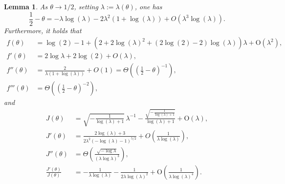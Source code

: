 \documentclass[a4paper,12pt]{article}
\newtheorem{lemma}[theorem]{Lemma}
\theoremstyle{definition}
\newcommand{\bigO}[1]{O\left({#1}\right)}
\newcommand{\bigTheta}[1]{\Theta\left({#1}\right)}
\newcommand{\halfminth}{\left(\frac 1 2 -\theta\right)}
\begin{document}
\begin{lemma}\label{lem_prop_large_theta}
    As $\theta\to 1/2$, setting $\lambda:=\lambda(\theta)$, one has
\begin{equation}\label{eq_large_theta_lambda}
   \frac{1}{2}-\theta =-\lambda\log(\lambda)-2\lambda^{2}(1+\log(\lambda))+O(\lambda^{3}\log(\lambda)).
\end{equation}
Furthermore, it holds that
\begin{align}
    f(\theta)&=\log\! \left(2\right)-1+\left(2+2 \log\! \left(\lambda \right)^{2}+\left(2 \log\! \left(2\right)-2\right) \log\! \left(\lambda \right)\right) \lambda +\mathrm{O}\! \left(\lambda^{2}\right),\label{eq_f_as_theta_large}\\
    f'(\theta)&=2\log \lambda+2\log(2)+\bigO{\lambda},\label{eq_fprim_as_theta_large}\\
    f''(\theta)&=\frac{2}{\lambda(1+\log(\lambda))}+\bigO{1}=\bigTheta{\halfminth^{-1}},\label{eq_fsec_as_theta_large}\\
    f'''(\theta)&=\Theta\left(\left(\frac 1 2 -\theta \right)^{-2}\right),\label{eq_fter_as_theta_large}
    \end{align}
and
\begin{align}
    J(\theta)&=\sqrt{-\frac{1}{\log\! \left(\lambda \right)+1}}\, \lambda^{-1}-\frac{\sqrt{-\frac{1}{\log\left(\lambda \right)+1}}}{\log\! \left(\lambda \right)+1}+\mathrm{O}\! \left(\lambda \right),\label{eq_J_as_theta_large}\\
   J'(\theta)&=\frac{2\log(\lambda)+3}{2\lambda^{2}(-\log(\lambda)-1)^{5/2}}+\bigO{\frac{1}{\lambda\log(\lambda)}},\label{eq_Jprim_as_theta_large}\\
   J''(\theta)&=\bigTheta{\frac{\sqrt{-\log \lambda}}{(\lambda\log\lambda)^3}},\label{eq_Jsec_as_theta_large}\\
   \frac{J'(\theta)}{J(\theta)}&=-\frac{1}{\lambda\log(\lambda)}-\frac{1}{2\lambda\log(\lambda)^{2}}+\mathrm{O}\! \left(\frac{1}{\lambda\log(\lambda)^4} \right).\label{eq_Jlogprim_as_theta_large}
    \end{align}    
\end{lemma}
\end{document}
